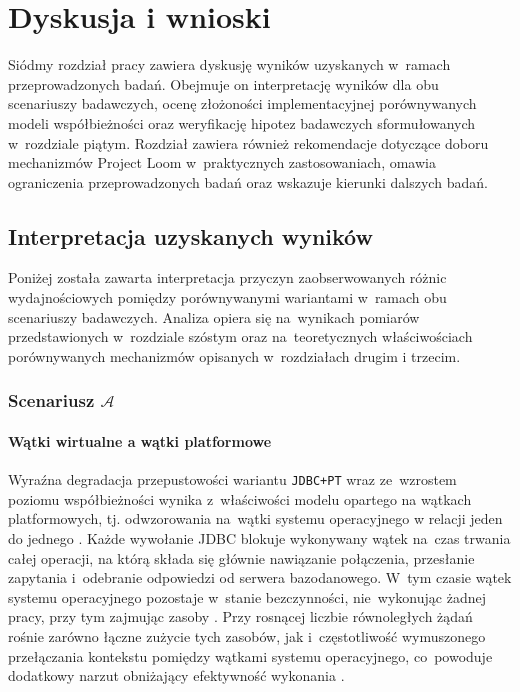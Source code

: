 \chapter{Dyskusja i wnioski}

Siódmy rozdział pracy zawiera dyskusję wyników uzyskanych w~ramach przeprowadzonych badań. Obejmuje on interpretację wyników dla obu scenariuszy badawczych, ocenę złożoności implementacyjnej porównywanych modeli współbieżności oraz weryfikację hipotez badawczych sformułowanych w~rozdziale piątym. Rozdział zawiera również rekomendacje dotyczące doboru mechanizmów Project Loom w~praktycznych zastosowaniach, omawia ograniczenia przeprowadzonych badań oraz wskazuje kierunki dalszych badań.

\section{Interpretacja uzyskanych wyników}
\label{sec:results-interpretation}

Poniżej została zawarta interpretacja przyczyn zaobserwowanych różnic wydajnościowych pomiędzy porównywanymi wariantami w~ramach obu scenariuszy badawczych. Analiza opiera się na~wynikach pomiarów przedstawionych w~rozdziale szóstym oraz na~teoretycznych właściwościach porównywanych mechanizmów opisanych w~rozdziałach drugim i trzecim.

\subsection{Scenariusz \ensuremath{\mathcal{A}}}

\subsubsection{Wątki wirtualne a wątki platformowe}
Wyraźna degradacja przepustowości wariantu \texttt{JDBC+PT} wraz ze~wzrostem poziomu współbieżności wynika z~właściwości modelu opartego na wątkach platformowych, tj. odwzorowania na~wątki systemu operacyjnego w relacji jeden do jednego \cite{tanenbaum2023}. Każde wywołanie JDBC blokuje wykonywany wątek na~czas trwania całej operacji, na którą składa się głównie nawiązanie połączenia, przesłanie zapytania i~odebranie odpowiedzi od serwera bazodanowego. W~tym czasie wątek systemu operacyjnego pozostaje w~stanie bezczynności, nie~wykonując żadnej pracy, przy tym zajmując zasoby \cite{tanenbaum2023,goetz2006}. Przy rosnącej liczbie równoległych żądań rośnie zarówno łączne zużycie tych zasobów, jak i~częstotliwość wymuszonego przełączania kontekstu pomiędzy wątkami systemu operacyjnego, co~powoduje dodatkowy narzut obniżający efektywność wykonania \cite{mogul1991}.

